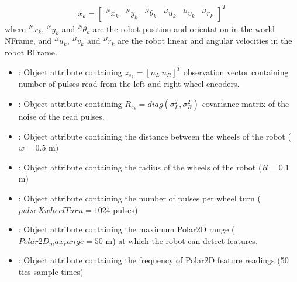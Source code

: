 \documentclass[letterpaper,10pt,english]{sphinxmanual}
\begin{document}
\begin{fulllineitems}
\begin{fulllineitems}
\begin{itemize}
\end{itemize}
\begin{equation}\label{equation:robot_simulation:eq:xsk}
\begin{split}x_k=\begin{bmatrix}{^N}x_k & {^N}y_k & {^N}\theta_k & {^B}u_k & {^B}v_k & {^B}r_k\end{bmatrix}^T\end{split}
\end{equation}
\sphinxAtStartPar
where \({^N}x_k\), \({^N}y_k\) and \({^N}\theta_k\) are the robot position and orientation in the world N\sphinxhyphen{}Frame, and \({^B}u_k\), \({^B}v_k\) and \({^B}r_k\) are the robot linear and angular velocities in the robot B\sphinxhyphen{}Frame.
\begin{itemize}
\item {} 
\sphinxAtStartPar
{} : Object attribute containing \(z_{s_k}=[n_L~n_R]^T\) observation vector containing number of pulses read from the left and right wheel encoders.

\item {} 
\sphinxAtStartPar
{} : Object attribute containing \(R_{s_k}=diag(\sigma_L^2,\sigma_R^2)\) covariance matrix of the noise of the read pulses\textasciigrave{}.

\item {} 
\sphinxAtStartPar
{} : Object attribute containing the distance between the wheels of the robot (\(w=0.5\) m)

\item {} 
\sphinxAtStartPar
{} : Object attribute containing the radius of the wheels of the robot (\(R=0.1\) m)

\item {} 
\sphinxAtStartPar
{} : Object attribute containing the number of pulses per wheel turn (\(pulseXwheelTurn=1024\) pulses)

\item {} 
\sphinxAtStartPar
{} : Object attribute containing the maximum Polar2D range (\(Polar2D_max_range=50\) m) at which the robot can detect features.

\item {} 
\sphinxAtStartPar
{} : Object attribute containing the frequency of Polar2D feature readings (50 tics \sphinxhyphen{}sample times\sphinxhyphen{})


\end{itemize}
\end{fulllineitems}
\end{fulllineitems}
\end{document}
